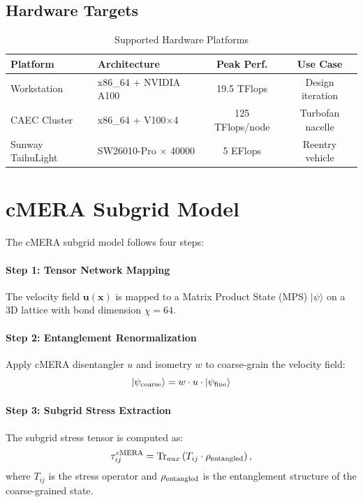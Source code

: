 \documentclass[journal]{elsarticle}
\begin{document}
\subsection{Hardware Targets}

\begin{table}[ht]
\centering
\caption{Supported Hardware Platforms}
\label{tab:hw}
\begin{tabular}{llcc}
\toprule
Platform & Architecture & Peak Perf. & Use Case \\
\midrule
Workstation & x86\_64 + NVIDIA A100 & 19.5 TFlops & Design iteration \\
CAEC Cluster & x86\_64 + V100$\times$4 & 125 TFlops/node & Turbofan nacelle \\
Sunway TaihuLight & SW26010-Pro $\times$ 40000 & 5 EFlops & Reentry vehicle \\
\bottomrule
\end{tabular}
\end{table}

\section{cMERA Subgrid Model}
\label{sec:cmera}

The cMERA subgrid model follows four steps:

\paragraph{Step 1: Tensor Network Mapping}
The velocity field $\mathbf{u}(\mathbf{x})$ is mapped to a Matrix Product State (MPS) $|\psi\rangle$ on a 3D lattice with bond dimension $\chi = 64$.

\paragraph{Step 2: Entanglement Renormalization}
Apply cMERA disentangler $u$ and isometry $w$ to coarse-grain the velocity field:
\begin{equation}
|\psi_{\rm coarse}\rangle = w \cdot u \cdot |\psi_{\rm fine}\rangle
\end{equation}

\paragraph{Step 3: Subgrid Stress Extraction}
The subgrid stress tensor is computed as:
\begin{equation}
\tau_{ij}^{\rm cMERA} = \mathrm{Tr}_{aux}\left(T_{ij} \cdot \rho_{\rm entangled}\right),
\end{equation}
where $T_{ij}$ is the stress operator and $\rho_{\rm entangled}$ is the entanglement structure of the coarse-grained state.
\end{document}
